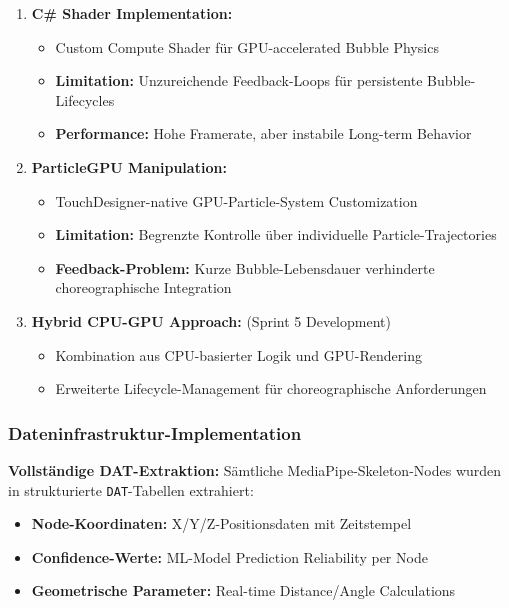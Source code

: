 \begin{enumerate}
    \item \textbf{C\# Shader Implementation:}
    \begin{itemize}
        \item Custom Compute Shader für GPU-accelerated Bubble Physics
        \item \textbf{Limitation:} Unzureichende Feedback-Loops für persistente Bubble-Lifecycles
        \item \textbf{Performance:} Hohe Framerate, aber instabile Long-term Behavior
    \end{itemize}
    
    \item \textbf{ParticleGPU Manipulation:}
    \begin{itemize}
        \item TouchDesigner-native GPU-Particle-System Customization
        \item \textbf{Limitation:} Begrenzte Kontrolle über individuelle Particle-Trajectories
        \item \textbf{Feedback-Problem:} Kurze Bubble-Lebensdauer verhinderte choreographische Integration
    \end{itemize}
    
    \item \textbf{Hybrid CPU-GPU Approach:} (Sprint 5 Development)
    \begin{itemize}
        \item Kombination aus CPU-basierter Logik und GPU-Rendering
        \item Erweiterte Lifecycle-Management für choreographische Anforderungen
    \end{itemize}
\end{enumerate}

\subsubsection{Dateninfrastruktur-Implementation}

\textbf{Vollständige DAT-Extraktion:}
Sämtliche MediaPipe-Skeleton-Nodes wurden in strukturierte \texttt{DAT}-Tabellen extrahiert:

\begin{itemize}
    \item \textbf{Node-Koordinaten:} X/Y/Z-Positionsdaten mit Zeitstempel
    \item \textbf{Confidence-Werte:} ML-Model Prediction Reliability per Node
    \item \textbf{Geometrische Parameter:} Real-time Distance/Angle Calculations
\end{itemize}

